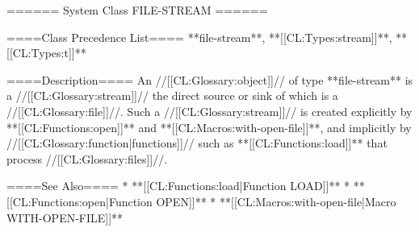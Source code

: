 ====== System Class FILE-STREAM ======

====Class Precedence List====
**file-stream**, **[[CL:Types:stream]]**, **[[CL:Types:t]]**

====Description====
An //[[CL:Glossary:object]]// of type **file-stream** is a //[[CL:Glossary:stream]]// the direct source or sink of which is a //[[CL:Glossary:file]]//. Such a //[[CL:Glossary:stream]]// is created explicitly by **[[CL:Functions:open]]** and **[[CL:Macros:with-open-file]]**, and implicitly by //[[CL:Glossary:function|functions]]// such as **[[CL:Functions:load]]** that process //[[CL:Glossary:files]]//.

====See Also====
  * **[[CL:Functions:load|Function LOAD]]**
  * **[[CL:Functions:open|Function OPEN]]**
  * **[[CL:Macros:with-open-file|Macro WITH-OPEN-FILE]]**

 
